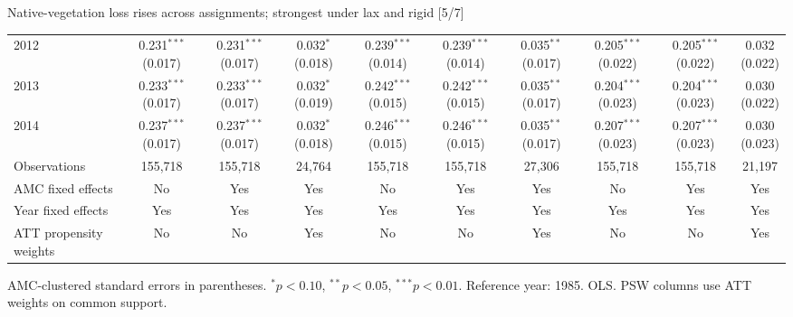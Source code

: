 \documentclass[aspectratio=169]{beamer}
\begin{document}
\begin{frame}{Native-vegetation loss rises across assignments; strongest under lax and rigid [5/7]}
{\begin{tabular}{@{}l*{9}{c}@{}}
2012 & \shortstack{0.231$^{***}$\\(0.017)} & \shortstack{0.231$^{***}$\\(0.017)} & \shortstack{0.032$^{*}$\\(0.018)} & \shortstack{0.239$^{***}$\\(0.014)} & \shortstack{0.239$^{***}$\\(0.014)} & \shortstack{0.035$^{**}$\\(0.017)} & \shortstack{0.205$^{***}$\\(0.022)} & \shortstack{0.205$^{***}$\\(0.022)} & \shortstack{0.032\\(0.022)} \\
2013 & \shortstack{0.233$^{***}$\\(0.017)} & \shortstack{0.233$^{***}$\\(0.017)} & \shortstack{0.032$^{*}$\\(0.019)} & \shortstack{0.242$^{***}$\\(0.015)} & \shortstack{0.242$^{***}$\\(0.015)} & \shortstack{0.035$^{**}$\\(0.017)} & \shortstack{0.204$^{***}$\\(0.023)} & \shortstack{0.204$^{***}$\\(0.023)} & \shortstack{0.030\\(0.022)} \\
2014 & \shortstack{0.237$^{***}$\\(0.017)} & \shortstack{0.237$^{***}$\\(0.017)} & \shortstack{0.032$^{*}$\\(0.018)} & \shortstack{0.246$^{***}$\\(0.015)} & \shortstack{0.246$^{***}$\\(0.015)} & \shortstack{0.035$^{**}$\\(0.017)} & \shortstack{0.207$^{***}$\\(0.023)} & \shortstack{0.207$^{***}$\\(0.023)} & \shortstack{0.030\\(0.023)} \\
\midrule
Observations & 155,718 & 155,718 & 24,764 & 155,718 & 155,718 & 27,306 & 155,718 & 155,718 & 21,197 \\
AMC fixed effects & No & Yes & Yes & No & Yes & Yes & No & Yes & Yes \\
Year fixed effects & Yes & Yes & Yes & Yes & Yes & Yes & Yes & Yes & Yes \\
ATT propensity weights & No & No & Yes & No & No & Yes & No & No & Yes \\
\bottomrule
\end{tabular}%
}
\vspace{0.1em}
{\tiny\color{ZMidGray} AMC-clustered standard errors in parentheses. $^{*}p<0.10$, $^{**}p<0.05$, $^{***}p<0.01$. Reference year: 1985. OLS. PSW columns use ATT weights on common support.}
\end{frame}
\end{document}
